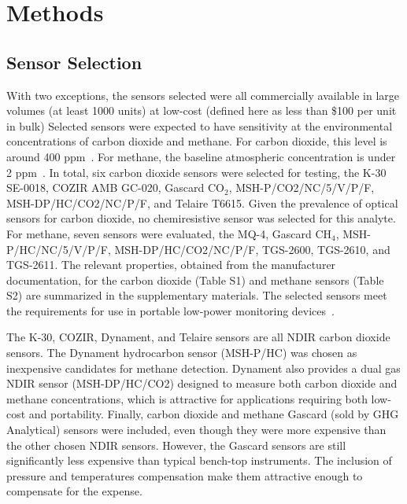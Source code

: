 \documentclass[preprint,sort&compress]{elsarticle}
\begin{document}
	\section{Methods}
		\label{sec:methods}
		
		\subsection{Sensor Selection}

			With two exceptions, the sensors selected were all commercially available in large volumes (at least 1000 units) at low-cost (defined here as less than \$100 per unit in bulk)
			Selected sensors were expected to have sensitivity at the environmental concentrations of carbon dioxide and methane.
			For carbon dioxide, this level is around 400 ppm~\cite{blasing_recent_2016,dlugokencky_trends_2016}.
			For methane, the baseline atmospheric concentration is under 2 ppm~\cite{turner_large_2016,bamberger_spatial_2014,dlugokencky_trends_2016-1}.
			In total, six carbon dioxide sensors were selected for testing, the K-30 SE-0018, COZIR AMB GC-020, Gascard CO$_{2}$, MSH-P/CO2/NC/5/V/P/F, MSH-DP/HC/CO2/NC/P/F, and Telaire T6615.
			Given the prevalence of optical sensors for carbon dioxide, no chemiresistive sensor was selected for this analyte.
			For methane, seven sensors were evaluated, the MQ-4, Gascard CH$_{4}$, MSH-P/HC/NC/5/V/P/F, MSH-DP/HC/CO2/NC/P/F, TGS-2600, TGS-2610, and TGS-2611.
			The relevant properties, obtained from the manufacturer documentation, for the carbon dioxide (Table S1) and methane sensors (Table S2) are summarized in the supplementary materials.
			The selected sensors meet the requirements for use in portable low-power monitoring devices~\cite{karpov_energy_2013}.
			
			The K-30, COZIR, Dynament, and Telaire sensors are all NDIR carbon dioxide sensors.
			The Dynament hydrocarbon sensor (MSH-P/HC) was chosen as inexpensive candidates for methane detection.
			Dynament also provides a dual gas NDIR sensor (MSH-DP/HC/CO2) designed to measure both carbon dioxide and methane concentrations, which is attractive for applications requiring both low-cost and portability.
			Finally, carbon dioxide and methane Gascard (sold by GHG Analytical) sensors were included, even though they were more expensive than the other chosen NDIR sensors.
			 However, the Gascard sensors are still significantly less expensive than typical bench-top instruments. The inclusion of pressure and temperatures compensation make them attractive enough to compensate for the expense.
			
\end{document}
